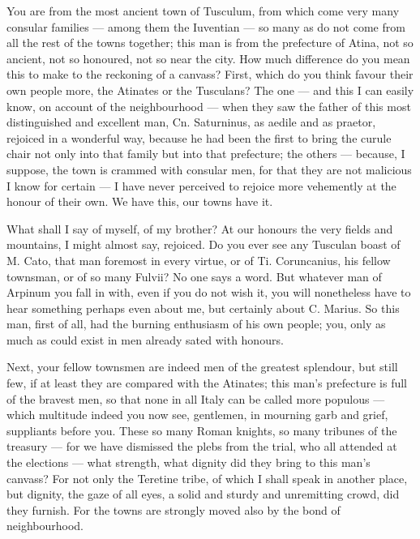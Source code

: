  You are from the most ancient town of Tusculum, from which come very many consular families --- among them the Iuventian --- so many as do not come from all the rest of the towns together; this man is from the prefecture of Atina, not so ancient, not so honoured, not so near the city. How much difference do you mean this to make to the reckoning of a canvass? First, which do you think favour their own people more, the Atinates or the Tusculans? The one --- and this I can easily know, on account of the neighbourhood --- when they saw the father of this most distinguished and excellent man, Cn. Saturninus, as aedile and as praetor, rejoiced in a wonderful way, because he had been the first to bring the curule chair not only into that family but into that prefecture; the others --- because, I suppose, the town is crammed with consular men, for that they are not malicious I know for certain --- I have never perceived to rejoice more vehemently at the honour of their own. We have this, our towns have it.

 What shall I say of myself, of my brother? At our honours the very fields and mountains, I might almost say, rejoiced. Do you ever see any Tusculan boast of M. Cato, that man foremost in every virtue, or of Ti. Coruncanius, his fellow townsman, or of so many Fulvii? No one says a word. But whatever man of Arpinum you fall in with, even if you do not wish it, you will nonetheless have to hear something perhaps even about me, but certainly about C. Marius. So this man, first of all, had the burning enthusiasm of his own people; you, only as much as could exist in men already sated with honours.

 Next, your fellow townsmen are indeed men of the greatest splendour, but still few, if at least they are compared with the Atinates; this man's prefecture is full of the bravest men, so that none in all Italy can be called more populous --- which multitude indeed you now see, gentlemen, in mourning garb and grief, suppliants before you. These so many Roman knights, so many tribunes of the treasury --- for we have dismissed the plebs from the trial, who all attended at the elections --- what strength, what dignity did they bring to this man's canvass? For not only the Teretine tribe, of which I shall speak in another place, but dignity, the gaze of all eyes, a solid and sturdy and unremitting crowd, did they furnish. For the towns are strongly moved also by the bond of neighbourhood.

